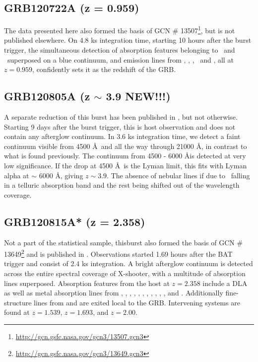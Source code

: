 \documentclass{aa}    %
\begin{document}
\subsection{GRB120722A (z = 0.959)}
The data presented here also formed the basis of GCN \#
13507\footnote{\url{http://gcn.gsfc.nasa.gov/gcn3/13507.gcn3}}, but is not
published elsewhere. On 4.8 ks integration time, starting 10 hours after the
burst trigger, the simultaneous detection of absorption features belonging to
\mgii~and \feii~superposed on a blue continuum, and emission lines from \oii,
\hg, \hb, \oiii~and \ha, all at $z = 0.959$, confidently sets it as the
redshift of the GRB.



\subsection{GRB120805A (z $\sim$ 3.9 NEW!!!)}
A separate reduction of this burst has been published in \citet{Kruhler2015},
but not otherwise. Starting 9 days after the burst trigger, this is host
observation and does not contain any afterglow continuum. In 3.6 ks integration
time, we detect a faint continuum visible from 4500 \AA~and all the way through
21000 \AA, in contrast to what is found previously. The continuum from 4500 -
6000 \AA is detected at very low significance. If the drop at 4500 \AA~is the
Lyman limit, this fits with Lyman alpha at $\sim$ 6000 \AA, giving $z \sim
3.9$. The absence of nebular lines if due to \oii~falling in a telluric
absorption band and the rest being shifted out of the wavelength coverage.

\subsection{GRB120815A* (z = 2.358)} 
Not a part of the statistical sample, thisburst also formed the basis of  GCN
\# 13649\footnote{\url{http://gcn.gsfc.nasa.gov/gcn3/13649.gcn3}} and is
published in \citet{Kruhler2013}. Observations started 1.69 hours after the BAT
trigger and consist of 2.4 ks integration. A bright afterglow continuum is
detected across the entire spectral coverage of X-shooter, with a multitude of
absorption lines superposed. Absorption features from the host at $z = 2.358$
include a DLA as well as metal absorption lines from \nv, \sii, \SIii, \oi,
\civ, \SIiv, \feii, \alii, \aliii, \mnii, \mgii, and \mgi. Additionally
fine-structure lines from \NIii and \feii are exited local to the GRB.
Intervening systems are found at $z = 1.539$, $z = 1.693$, and $z = 2.00$.
\end{document}
